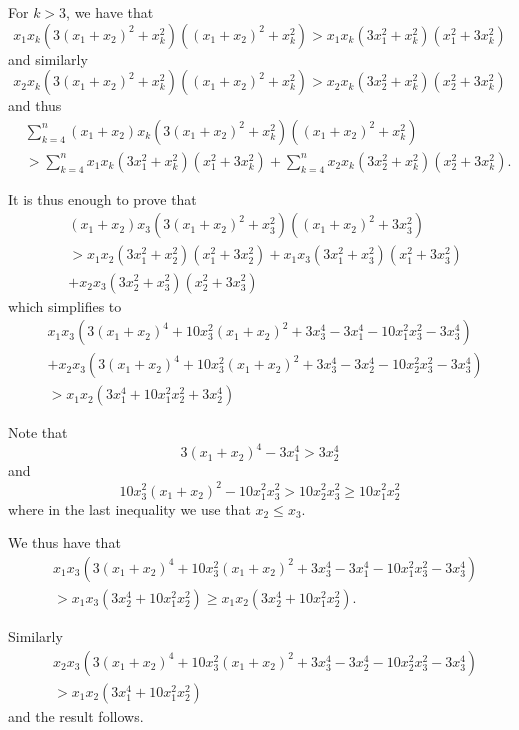 \documentclass{article}
\begin{document}
\begin{enumerate}[1.]
For $k > 3$, we have that
\[
	x_1 x_k (3{(x_1 + x_2)}^2 + x_k^2)({(x_1 + x_2)}^2 + x_k^2) > x_1 x_k (3x_1^2 + x_k^2)(x_1^2 + 3x_k^2)
\]
and similarly
\[
	x_2 x_k (3{(x_1 + x_2)}^2 + x_k^2)({(x_1 + x_2)}^2 + x_k^2) > x_2 x_k (3x_2^2 + x_k^2)(x_2^2 + 3x_k^2)
\]
and thus
\begin{align*}
	& \sum_{k = 4}^{n} (x_1 + x_2) x_k (3{(x_1 + x_2)}^2 + x_k^2)({(x_1 + x_2)}^2 + x_k^2) \\
	& > \sum_{k = 4}^{n} x_1 x_k (3x_1^2 + x_k^2)(x_1^2 + 3x_k^2) + \sum_{k = 4}^{n} x_2 x_k (3x_2^2 + x_k^2)(x_2^2 + 3x_k^2).
\end{align*}

It is thus enough to prove that
\begin{align*}
	& (x_1 + x_2) x_3 (3{(x_1 + x_2)}^2 + x_3^2)({(x_1 + x_2)}^2 + 3x_3^2) \\
	& > x_1 x_2 (3x_1^2 + x_2^2)(x_1^2 + 3x_2^2) + x_1 x_3 (3x_1^2 + x_3^2)(x_1^2 + 3x_3^2) \\
	& + x_2 x_3 (3x_2^2 + x_3^2)(x_2^2 + 3x_3^2)
\end{align*}
which simplifies to
\begin{align*}
	& x_1 x_3 (3{(x_1 + x_2)}^4 + 10 x_3^2 {(x_1 + x_2)}^2 + 3x_3^4 - 3x_1^4 - 10x_1^2 x_3^2 - 3x_3^4) \\
	& + x_2 x_3 (3{(x_1 + x_2)}^4 + 10 x_3^2 {(x_1 + x_2)}^2 + 3x_3^4 - 3x_2^4 - 10x_2^2 x_3^2 - 3x_3^4) \\
	& > x_1 x_2 (3x_1^4 + 10x_1^2 x_2^2 + 3x_2^4)
\end{align*}

Note that
\[
	3{(x_1 + x_2)}^4 - 3x_1^4 > 3x_2^4
\]
and
\[
	10 x_3^2 {(x_1 + x_2)}^2 - 10x_1^2 x_3^2 > 10 x_2^2 x_3^2 \geq 10 x_1^2 x_2^2
\]
where in the last inequality we use that $x_2 \leq x_3$.

We thus have that
\begin{align*}
	& x_1 x_3 (3{(x_1 + x_2)}^4 + 10 x_3^2 {(x_1 + x_2)}^2 + 3x_3^4 - 3x_1^4 - 10x_1^2 x_3^2 - 3x_3^4) \\
	& > x_1 x_3 (3x_2^4 + 10x_1^2 x_2^2) \geq x_1 x_2 (3x_2^4 + 10x_1^2 x_2^2).
\end{align*}

Similarly
\begin{align*}
	& x_2 x_3 (3{(x_1 + x_2)}^4 + 10 x_3^2 {(x_1 + x_2)}^2 + 3x_3^4 - 3x_2^4 - 10x_2^2 x_3^2 - 3x_3^4) \\
	& > x_1 x_2 (3x_1^4 + 10x_1^2 x_2^2)
\end{align*}
and the result follows.


\end{enumerate}
\end{document}
